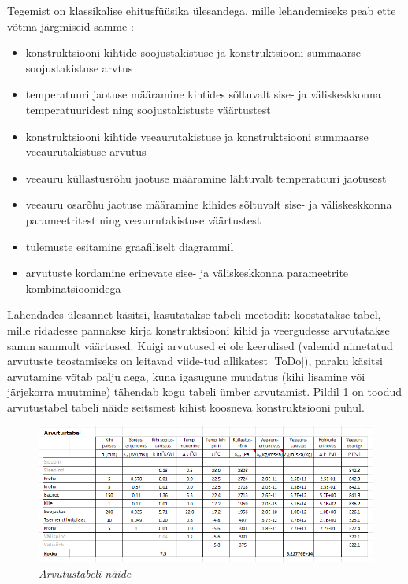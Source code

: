 Tegemist on klassikalise ehitusfüüsika ülesandega, mille lehandemiseks peab ette võtma järgmiseid samme \cite{iso_13788}:
\begin{itemize}
    \item konstruktsiooni kihtide soojustakistuse ja konstruktsiooni summaarse soojustakistuse arvtus
    \item temperatuuri jaotuse määramine kihtides sõltuvalt sise- ja väliskeskkonna temperatuuridest ning 
    soojustakistuste väärtustest
    \item konstruktsiooni kihtide veeaurutakistuse ja konstruktsiooni summaarse veeaurutakistuse arvutus
    \item veeauru küllastusrõhu jaotuse määramine lähtuvalt temperatuuri jaotusest
    \item veeauru osarõhu jaotuse määramine kihides sõltuvalt sise- ja väliskeskkonna parameetritest ning 
    veeaurutakistuse väärtustest
    \item tulemuste esitamine graafiliselt diagrammil
    \item arvutuste kordamine erinevate sise- ja väliskeskkonna parameetrite kombinatsioonidega
\end{itemize}

Lahendades ülesannet käsitsi, kasutatakse tabeli meetodit: koostatakse tabel, mille ridadesse pannakse 
kirja konstruktsiooni kihid ja veergudesse arvutatakse samm sammult väärtused. 
Kuigi arvutused ei ole keerulised (valemid nimetatud arvutuste teostamiseks on 
leitavad viide-tud allikatest [\colorbox{BurntOrange}{ToDo}]), paraku käsitsi arvutamine 
võtab palju aega, kuna igasugune muudatus (kihi lisamine või järjekorra muutmine) tähendab 
kogu tabeli ümber arvutamist. Pildil \ref{fig:excel_table_sample} on toodud arvutustabel tabeli näide
seitsmest kihist koosneva konstruktsiooni puhul.

\begin{figure}[ht]
    \centering
    \includegraphics[width=.8\textwidth]{figures/problem_statement/04_calc_table.png}
    \caption[Näide niiskustehnilise analüüsi tulemuste esitamisest tabelis]{\textit{Arvutustabeli näide}}
    \label{fig:excel_table_sample}
\end{figure}

